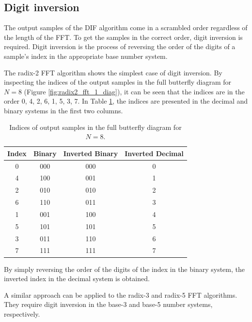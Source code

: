 \documentclass[a4paper,12pt, master]{etf}
\begin{document}
\subsection{Digit inversion}

The output samples of the DIF algorithm come in a scrambled order regardless of the length of the FFT. To get the samples in the correct order, digit inversion is required. Digit inversion is the process of reversing the order of the digits of a sample's index in the appropriate base number system.

The radix-2 FFT algorithm shows the simplest case of digit inversion. By inspecting the indices of the output samples in the full butterfly diagram for $N=8$ (Figure \ref{fig:radix2_fft_1_diag}), it can be seen that the indices are in the order 0, 4, 2, 6, 1, 5, 3, 7. In Table \ref{tab:radix2_fft_1_diag}, the indices are presented in the decimal and binary systems in the first two columns.

\begin{table}[H]
    \centering
    \begin{tabular}{|c|c|c|c|}
        \hline
        \textbf{Index} & \textbf{Binary} & \textbf{Inverted Binary} & \textbf{Inverted Decimal} \\
        \hline
        0 & 000 & 000 & 0 \\
        \hline
        4 & 100 & 001 & 1 \\
        \hline
        2 & 010 & 010 & 2 \\
        \hline
        6 & 110 & 011 & 3 \\
        \hline
        1 & 001 & 100 & 4 \\
        \hline
        5 & 101 & 101 & 5 \\
        \hline
        3 & 011 & 110 & 6 \\
        \hline
        7 & 111 & 111 & 7 \\
        \hline
    \end{tabular}
    \caption{Indices of output samples in the full butterfly diagram for $N=8$.}
    \label{tab:radix2_fft_1_diag}
\end{table}

By simply reversing the order of the digits of the index in the binary system, the inverted index in the decimal system is obtained.

A similar approach can be applied to the radix-3 and radix-5 FFT algorithms. They require digit inversion in the base-3 and base-5 number systems, respectively.
\end{document}
